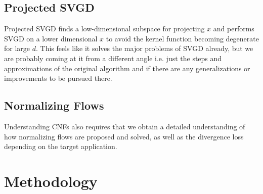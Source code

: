 \documentclass[12pt]{article}
\renewcommand{\[}{\left[}
\renewcommand{\]}{\right]}
\renewcommand{\(}{\left(}
\renewcommand{\)}{\right)}
\begin{document}

\subsection{Projected SVGD}
\citep{chen_projected_2020} Projected SVGD finds a low-dimensional subspace for projecting $x$ and performs SVGD on a lower dimensional $x$ to avoid the kernel function becoming degenerate for large $d$. This feels like it solves the major problems of SVGD already, but we are probably coming at it from a different angle i.e. just the steps and approximations of the original algorithm and if there are any generalizations or improvements to be pursued there.

\subsection{Normalizing Flows}
Understanding CNFs also requires that we obtain a detailed understanding of how normalizing flows are proposed and solved, as well as the divergence loss depending on the target application. \cite{papamakarios_normalizing_2021}

\section{Methodology}
\end{document}
